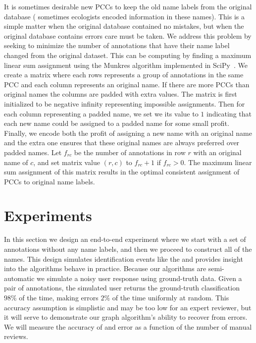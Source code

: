 It is sometimes desirable new PCCs to keep the old name labels from the original database (\eg{} sometimes
ecologists encoded information in these names). This is a simple matter when the original database contained no
mistakes, but when the original database contains errors care must be taken. We address this problem by seeking to
minimize the number of annotations that have their name label changed from the original dataset. This can be
computing by finding a maximum linear sum assignment using the Munkres algorithm implemented in
SciPy~\cite{eric_jones_scipy_2001}. We create a matrix where each rows represents a group of annotations in the
same PCC and each column represents an original name. If there are more PCCs than original names the columns are
padded with extra values. The matrix is first initialized to be negative infinity representing impossible
assignments. Then for each column representing a padded name, we set we its value to $1$ indicating that each new
name could be assigned to a padded name for some small profit. Finally, we encode both the profit of assigning a
new name with an original name and the extra one ensures that these original names are always preferred over padded
names. Let $f_{rc}$ be the number of annotations in row $r$ with an original name of $c$, and set matrix value %
$(r, c)$ to $f_{rc} + 1$ if $f_{rc} > 0$. The maximum linear sum assignment of this matrix results in the optimal
consistent assignment of PCCs to original name labels.
  
  
\section{Experiments}\label{sec:graphexpt}

    In this section we design an end-to-end experiment where we start with a set of annotations without any name
      labels, and then we proceed to construct all of the names.
    This design simulates identification events like the \GZC{} and provides insight into the algorithms behave
      in practice.
    Because our algorithms are semi-automatic we simulate a noisy user response using ground-truth data.
    Given a pair of annotations, the simulated user returns the ground-truth classification $98\percent$ of the
      time, making errors $2\percent$ of the time uniformly at random.
    This accuracy assumption is simplistic and may be too low for an expert reviewer, but it will serve to
      demonstrate our graph algorithm's ability to recover from errors.
    We will measure the accuracy of and error as a function of the number of manual reviews.

